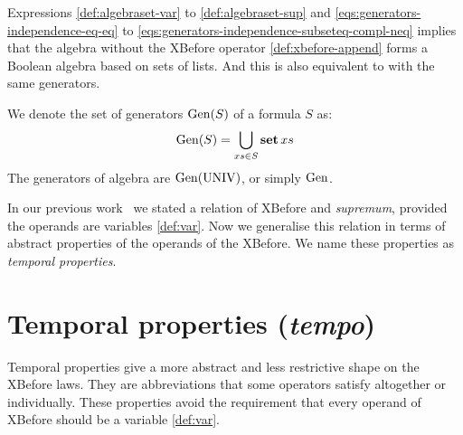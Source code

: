\documentclass[12pt,openright,twoside,a4paper,oldfontcommands,english,brazil,final]{abntex2}
\theoremstyle{theo}
\def\tempotext{tempo\xspace}
\def\tempoop{\ensuremath\operatorname{\mathbf{tempo}}}
\newcommand{\tempo}[2][1-4]{\ensuremath\tempoop_{#1} #2}
\def\True{\ensuremath\operatorname{UNIV}}
\def\listsetop{\ensuremath\operatorname{\mathbf{set}}}
\newcommand{\listset}[1]{\ensuremath\listsetop #1}
\def\generators{\ensuremath\mathrm{Gen}}
\begin{document}
Expressions \eqref{def:algebraset-var} to \eqref{def:algebraset-sup} and \eqref{eqs:generators-independence-eq-eq} to \eqref{eqs:generators-independence-subseteq-compl-neq} implies that the \ac{algebra} without the \ac{XBefore} operator \eqref{def:xbefore-append} forms a Boolean algebra based on sets of lists.
And this is also equivalent to  with the same generators.

We denote the set of generators $\generators(S)$ of a formula $S$ as:
\begin{equation}
\generators(S) = \bigcup_{xs \in S} \listset{xs}\label{eq:generators}
\end{equation}
%
The generators of \ac{algebra} are $\generators(\True)$, or simply $\generators$.

In our previous work~\cite{DM2015} we stated a relation of \ac{XBefore} and \emph{supremum}, provided the operands are variables \eqref{def:var}.
Now we generalise this relation in terms of abstract properties of the operands of the \ac{XBefore}.
We name these properties as \emph{temporal properties}.

\section{Temporal properties (\emph{\tempotext})}
\label{sec:temporal-properties}

Temporal properties give a more abstract and less restrictive shape on the \ac{XBefore} laws.
They are abbreviations that some operators satisfy altogether or individually.
These properties avoid the requirement that every operand of \ac{XBefore} should be a variable \eqref{def:var}.
\end{document}
